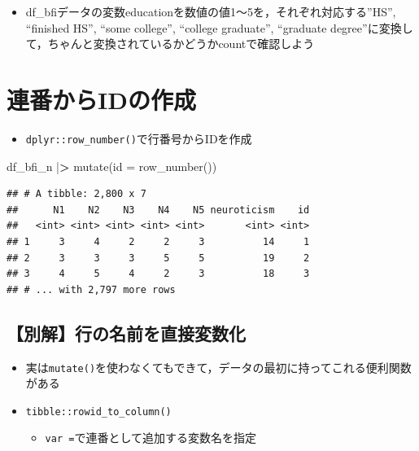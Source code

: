 \documentclass[
  xelatex,ja=standard, b5paper]{bxjsbook}
\newenvironment{Shaded}{\begin{snugshade}}{\end{snugshade}}
\newcommand{\AttributeTok}[1]{\textcolor[rgb]{0.77,0.63,0.00}{#1}}
\newcommand{\ErrorTok}[1]{\textcolor[rgb]{0.64,0.00,0.00}{\textbf{#1}}}
\newcommand{\FunctionTok}[1]{\textcolor[rgb]{0.00,0.00,0.00}{#1}}
\newcommand{\NormalTok}[1]{#1}
\newcommand{\SpecialCharTok}[1]{\textcolor[rgb]{0.00,0.00,0.00}{#1}}
\providecommand{\tightlist}{%
  \setlength{\itemsep}{0pt}\setlength{\parskip}{0pt}}
\begin{document}
\begin{itemize}
\tightlist
\item
  df\_bfiデータの変数educationを数値の値1～5を，それぞれ対応する''HS'', ``finished HS'', ``some college'', ``college graduate'', ``graduate degree''に変換して，ちゃんと変換されているかどうかcountで確認しよう
\end{itemize}

\hypertarget{mu-seq}{%
\section{連番からIDの作成}\label{mu-seq}}

\begin{itemize}
\tightlist
\item
  \texttt{dplyr::row\_number()}で行番号からIDを作成
\end{itemize}

\begin{Shaded}
\begin{Highlighting}[]
\NormalTok{df\_bfi\_n }\SpecialCharTok{|}\ErrorTok{\textgreater{}} 
  \FunctionTok{mutate}\NormalTok{(}\AttributeTok{id =} \FunctionTok{row\_number}\NormalTok{())}
\end{Highlighting}
\end{Shaded}

\begin{verbatim}
## # A tibble: 2,800 x 7
##      N1    N2    N3    N4    N5 neuroticism    id
##   <int> <int> <int> <int> <int>       <int> <int>
## 1     3     4     2     2     3          14     1
## 2     3     3     3     5     5          19     2
## 3     4     5     4     2     3          18     3
## # ... with 2,797 more rows
\end{verbatim}

\hypertarget{mu-seq-other}{%
\subsection{【別解】行の名前を直接変数化}\label{mu-seq-other}}

\begin{itemize}
\tightlist
\item
  実は\texttt{mutate()}を使わなくてもできて，データの最初に持ってこれる便利関数がある
\item
  \texttt{tibble::rowid\_to\_column()}

  \begin{itemize}
  \tightlist
  \item
    \texttt{var\ =}で連番として追加する変数名を指定
  \end{itemize}
\end{itemize}
\end{document}
